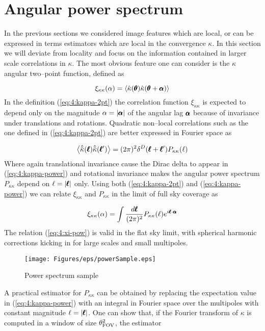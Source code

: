 
\section{Angular power spectrum}
In the previous sections we considered image features which are local, or can be expressed in terms estimators which are local in the convergence $\kappa$. In this section we will deviate from locality and focus on the information contained in larger scale correlations in $\kappa$. The most obvious feature one can consider is the $\kappa$ angular two--point function, defined as 

\begin{equation}
\label{eq:4:kappa-2pt}
\xi_{\kappa\kappa}(\alpha) = \langle\hat{\kappa}(\pmb{\theta})\hat{\kappa}(\pmb{\theta}+\pmb{\alpha})\rangle 
\end{equation} 
%
In the definition (\ref{eq:4:kappa-2pt}) the correlation function $\xi_{\kappa\kappa}$ is expected to depend only on the magnitude $\alpha=\vert\pmb{\alpha}\vert$ of the angular lag $\pmb{\alpha}$ because of invariance under translations and rotations. Quadratic non--local correlations such as the one defined in (\ref{eq:4:kappa-2pt}) are better expressed in Fourier space as

\begin{equation}
\label{eq:4:kappa-power}
\left\langle\hat{\tilde{\kappa}}(\pmb{\ell})\hat{\tilde{\kappa}}(\pmb{\ell}')\right\rangle = (2\pi)^2 \delta^D(\pmb{\ell}+\pmb{\ell}')P_{\kappa\kappa}(\ell)
\end{equation}
%
Where again translational invariance cause the Dirac delta to appear in (\ref{eq:4:kappa-power}) and rotational invariance makes the angular power spectrum $P_{\kappa\kappa}$ depend on $\ell=\vert\pmb{\ell}\vert$ only. Using both (\ref{eq:4:kappa-2pt}) and (\ref{eq:4:kappa-power}) we can relate $\xi_{\kappa\kappa}$ and $P_{\kappa\kappa}$ in the limit of full sky coverage as 

\begin{equation}
\label{eq:4:xi-pow}
\xi_{\kappa\kappa}(\alpha) = \int \frac{d\pmb{\ell}}{(2\pi)^2}P_{\kappa\kappa}(\ell)e^{i\pmb{\ell}\cdot\pmb{\alpha}}
\end{equation}
%
The relation (\ref{eq:4:xi-pow}) is valid in the flat sky limit, with spherical harmonic corrections kicking in for large scales and small multipoles.
%
\begin{figure}
\begin{center}
\texttt{[image: Figures/eps/powerSample.eps]}
\end{center}
\caption{Power spectrum sample}
\label{fig:4:psample}
\end{figure}
%
A practical estimator for $P_{\kappa\kappa}$ can be obtained by replacing the expectation value in (\ref{eq:4:kappa-power}) with an integral in Fourier space over the multipoles with constant magnitude $\ell=\vert\pmb{\ell}\vert$. One can show that, if the Fourier transform of $\kappa$ is computed in a window of size $\theta_{\rm FOV}^2$, the estimator

